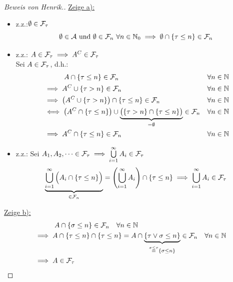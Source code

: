 \documentclass[12pt,a4paper]{article}
\begin{document}
\begin{proof}[Beweis von Henrik.]\enter
\underline{Zeige a):}\\
\begin{itemize} 
	\item z.z.:$\emptyset \in \mathcal{F}_\tau$\\
	\begin{equation*}
		\emptyset \in \mathcal{A} \text{ und } \emptyset \in \mathcal{F}_n\  \forall n \in \mathbb{N}_0 \implies \emptyset \cap \{\tau \leq n\} \in \mathcal{F}_n
	\end{equation*}
	\item z.z.: $A \in \mathcal{F}_\tau \implies A^C \in \mathcal{F}_\tau$\\
	Sei $A \in \mathcal{F}_\tau$, d.h.:
	\begin{align*}
		&{}\qquad \quad  A \cap \{\tau \leq n\} \in \mathcal{F}_n
		 &\forall n \in \mathbb{N}\\
		&\implies	A^C \cup \{\tau > n\} \in \mathcal{F}_n 
		 &\forall n \in \mathbb{N}\\
		&\implies 	\left(	A^C \cup \{\tau > n\}\right) \cap \{\tau \leq n\} \in \mathcal{F}_n
		 & \forall n \in \mathbb{N}\\
		& \iff \left(	A^C \cap \{\tau \leq n\}\right) \cup \underbrace{\big ( \{\tau > n\}\cap\{\tau \leq n\} \big )}_{= \emptyset} \in \mathcal{F}_n 
		 & \forall n \in \mathbb{N}\\
		&\implies A^C \cap \{\tau \leq n\} \in \mathcal{F}_n
		 & \forall n \in \mathbb{N}
	\end{align*}
	
	\item z.z.: Sei $A_1, A_2,\dots \in \mathcal{F}_\tau \implies \bigcup\limits_{i=1}^{\infty} A_i  \in \mathcal{F}_\tau$\\
	\begin{equation*}
		\underbrace{\bigcup\limits_{i=1}^{\infty} \Big (A_i \cap \{\tau \leq n\} \Big )}_{\in \mathcal{F}_n} = \left( \bigcup\limits_{i=1}^{\infty} A_i \right)\cap \{\tau \leq n\} \implies  \bigcup\limits_{i=1}^{\infty} A_i \in \mathcal{F}_\tau
	\end{equation*}
	
\end{itemize}

\underline{Zeige b):}\\
\begin{align*}
	&{}\qquad \quad  A \cap \{\sigma \leq n\}  \in \mathcal{F}_n \quad \forall n \in \mathbb{N}\\
	&\implies A \cap \{\tau \leq n\} \cap \{\tau \leq n\} = A \cap \underbrace{ \{\tau \vee \sigma \leq n\}}_{ \overset{\sigma \leq \tau}{=} \{\sigma \leq n\} } \in \mathcal{F}_n \quad \forall n \in \mathbb{N}\\
	&\implies A \in \mathcal{F}_\tau \\
\end{align*}


\end{proof}
\end{document}
